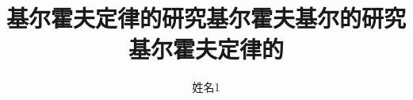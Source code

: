 \documentclass[bachelor, twoside]{NCEPU-thesis}
\title{基尔霍夫定律的研究基尔霍夫基尔的研究基尔霍夫定律的}{English Title and English Title and English Title}
\author{姓名1}{Test1}
\begin{document}
\makecoverbd





\thesistableofcontents











\nocite{*}








\cleardoublepage
\end{document}
